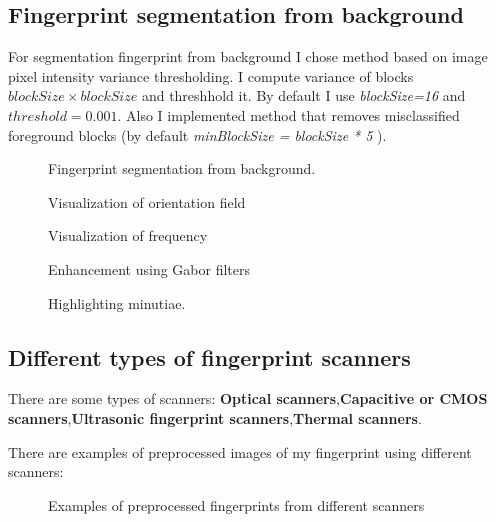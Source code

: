 \documentclass{article}
\begin{document}
\subsection{Fingerprint segmentation from background}
For segmentation fingerprint from background I chose method based on  image pixel intensity variance thresholding. I compute variance of blocks \(blockSize\times blockSize\) and threshhold it. By default I use \textit{blockSize=16} and \(threshold=0.001\). Also I implemented method that removes misclassified foreground blocks (by default \textit{minBlockSize = blockSize * 5} ).
\begin{figure}[htbp]
  \centering
  \def\svgscale{0.6}
  
  \caption{Fingerprint segmentation from background.}
\end{figure}
\begin{figure}[htbp]
  \centering
  \def\svgscale{0.6}
  
  \caption{Visualization of orientation field}
\end{figure}
\begin{figure}[htbp]
  \centering
  \def\svgscale{0.4}
  
  \caption{Visualization of frequency}
\end{figure}
\begin{figure}[htbp]
  \centering
  \def\svgscale{0.6}
  
  \caption{Enhancement using Gabor filters}
\end{figure}
\begin{figure}[htbp]
  \centering
  \def\svgscale{0.6}
  
  \caption{Highlighting minutiae.}
\end{figure}

\newpage

\subsection{Different types of fingerprint scanners}

There are some types of scanners: \textbf{Optical scanners},\textbf{Capacitive or CMOS scanners},\textbf{Ultrasonic fingerprint scanners},\textbf{Thermal scanners}.

There are examples of preprocessed images of my fingerprint using different scanners:
\begin{figure}[htbp] 
  \def\svgscale{0.5}
  
  \def\svgscale{0.5}
  
  \def\svgscale{0.5}
  
  \def\svgscale{0.5}
  
  \caption{Examples of preprocessed fingerprints from different scanners}
  \label{scanners}
\end{figure}
\end{document}
